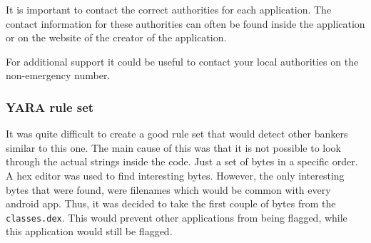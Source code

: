 It is important to contact the correct authorities for each application. 
The contact information for these authorities can often be found inside the application or on the website of the creator of the application.

For additional support it could be useful to contact your local authorities on the non-emergency number.

\newpage
\subsubsection{YARA rule set}

It was quite difficult to create a good rule set that would detect other bankers similar to this one.
The main cause of this was that it is not possible to look through the actual strings inside the code.
Just a set of bytes in a specific order.
A hex editor was used to find interesting bytes.
However, the only interesting bytes that were found, were filenames which would be common with every android app.
Thus, it was decided to take the first couple of bytes from the \texttt{classes.dex}.
This would prevent other applications from being flagged, while this application would still be flagged.


% 

